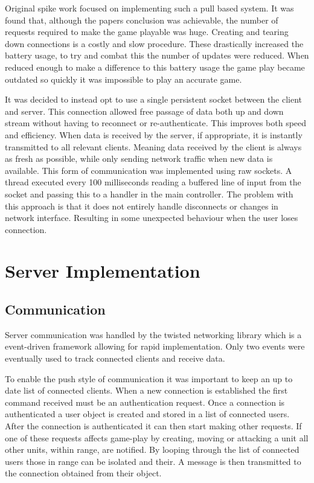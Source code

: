 Original spike work focused on implementing such a pull based system. It was found that, although the papers conclusion was achievable, the number of requests required to make the game playable was huge. Creating and tearing down connections is a costly and slow procedure. These drastically increased the battery usage, to try and combat this the number of updates were reduced. When reduced enough to make a difference to this battery usage the game play became outdated so quickly it was impossible to play an accurate game.

It was decided to instead opt to use a single persistent socket between the client and server. This connection allowed free passage of data both up and down stream without having to reconnect or re-authenticate. This improves both speed and efficiency. When data is received by the server, if appropriate, it is instantly transmitted to all relevant clients. Meaning data received by the client is always as fresh as possible, while only sending network traffic when new data is available. This form of communication was implemented using raw sockets. A thread executed every 100 milliseconds reading a buffered line of input from the socket and passing this to a handler in the main controller. The problem with this approach is that it does not entirely handle disconnects or changes in network interface. Resulting in some unexpected behaviour when the user loses connection.



\section{Server Implementation}
\subsection{Communication}
Server communication was handled by the twisted networking library which is a event-driven framework allowing for rapid implementation. Only two events were eventually used to track connected clients and receive data.

To enable the push style of communication it was important to keep an up to date list of connected clients. When a new connection is established the first command received must be an authentication request. Once a connection is authenticated a user object is created and stored in a list of connected users. After the connection is authenticated it can then start making other requests. If one of these requests affects game-play by creating, moving or attacking a unit all other units, within range, are notified. By looping through the list of connected users those in range can be isolated and their. A message is then transmitted to the connection obtained from their object.

